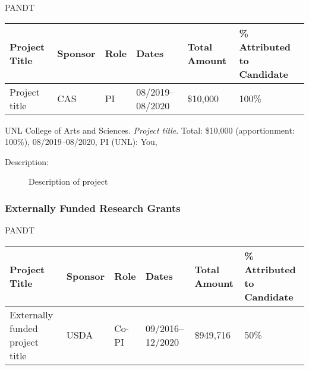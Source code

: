 \begin{taggedblock}{PANDT} %
  \begin{center}
    \footnotesize
    \begin{longtable}{@{}T{6.6cm}T{1.5cm}T{0.8cm}T{2.3cm}T{1.3cm}T{1.9cm}@{}}
      \toprule 
      \textbf{Project Title} & \textbf{Sponsor} & \textbf{Role} & \textbf{Dates}
      & \textbf{Total Amount} & \textbf{\% Attributed to Candidate}\tabularnewline
      \midrule 
      Project title & CAS & PI & 08/2019--08/2020 & \$10,000 &
      100\%\tabularnewline
      \bottomrule
    \end{longtable}\normalsize%
    \end{center}
\end{taggedblock}

\begin{grantsenum}
\item UNL College of Arts and Sciences. \emph{Project title}. Total: \$10,000
  (apportionment: 100\%), 08/2019–08/2020, PI (UNL): You, 
  \begin{description}
    \item[Description:] Description of project
      \end{description}
\end{grantsenum}

\subsubsection{Externally Funded Research Grants}

\begin{taggedblock}{PANDT} %
  \begin{center}
    \footnotesize
    \begin{longtable}{@{}T{6.6cm}T{1.5cm}T{0.8cm}T{2.3cm}T{1.3cm}T{1.9cm}@{}}
      \toprule 
      \textbf{Project Title} & \textbf{Sponsor} & \textbf{Role} & \textbf{Dates}
      & \textbf{Total Amount} & \textbf{\% Attributed to Candidate}\tabularnewline
      \midrule 
      Externally funded project title & USDA & Co-PI & 09/2016--12/2020 & \$949,716 &
      50\%\tabularnewline  
      \bottomrule
    \end{longtable}\normalsize%
    \end{center}
\end{taggedblock}

